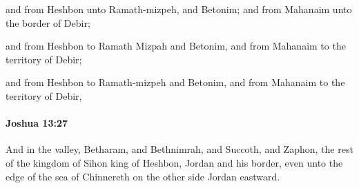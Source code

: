 			\begin{versebox}
					\item[BHS] 
					\item[ASV] and from Heshbon unto Ramath-mizpeh, and Betonim; and from Mahanaim unto the border of Debir;
					\item[NIV] and from Heshbon to Ramath Mizpah and Betonim, and from Mahanaim to the territory of Debir;
					\item[NRSV] and from Heshbon to Ramath-mizpeh and Betonim, and from Mahanaim to the territory of Debir,
			\end{versebox}

		\paragraph{Joshua 13:27} %
			\label{JOSHUA-13-27}

			And in the valley, Betharam, and Bethnimrah, and Succoth, and Zaphon, the rest of the kingdom of Sihon king of Heshbon, Jordan and his border, even unto the edge of the sea of Chinnereth on the other side Jordan eastward.

